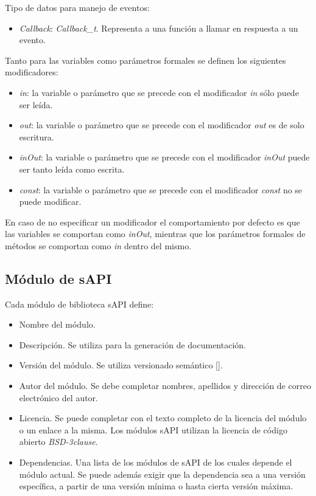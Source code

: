 Tipo de datos para manejo de eventos:

\begin{itemize}
\item
\emph{Callback}: \emph{Callback\_t}. Representa a una función a llamar en respuesta a un evento.
\end{itemize}



Tanto para las variables como parámetros formales se definen los siguientes modificadores:

\begin{itemize}
\item
\emph{in}: la variable o parámetro que se precede con el modificador \emph{in} sólo puede ser leída.
\item
\emph{out}: la variable o parámetro que se precede con el modificador \emph{out} es de solo escritura. 
\item
\emph{inOut}: la variable o parámetro que se precede con el modificador \emph{inOut} puede ser tanto leída como escrita.
\item
\emph{const}: la variable o parámetro que se precede con el modificador \emph{const} no se puede modificar.
\end{itemize}

En caso de no especificar un modificador el comportamiento por defecto es que las variables se comportan como \emph{inOut}, mientras que los parámetros formales de métodos se comportan como \emph{in} dentro del mismo.

\subsection{Módulo de sAPI}

Cada módulo de biblioteca sAPI define:

\begin{itemize}
\item
Nombre del módulo.
\item
Descripción. Se utiliza para la generación de documentación.
\item
Versión del módulo. Se utiliza versionado semántico [].
\item
Autor del módulo. Se debe completar nombres, apellidos y dirección de correo electrónico del autor. 
\item
Licencia. Se puede completar con el texto completo de la licencia del módulo o un enlace a la misma. Los módulos sAPI utilizan la licencia de código abierto \emph{BSD-3clause}.
\item
Dependencias. Una lista de los módulos de sAPI de los cuales depende el módulo actual. Se puede además exigir que la dependencia sea a una versión específica, a partir de una versión mínima o hasta cierta versión máxima.
\end{itemize}

